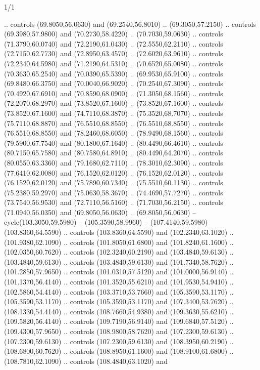 \begin{flagdescription}{1/1}
\begin{scope}[xshift=0.75\flaglength]
\begin{scope}[scale=0.00209\flagwidth,yshift=134.4mm,xshift=-29.7mm]
\begin{scope}[y=0.80pt, x=0.80pt, yscale=-1, xscale=1, inner sep=0pt, outer sep=0pt,line width=0.0015\flagwidth]
  .. controls (69.8050,56.0630) and (69.2540,56.8010) .. (69.3050,57.2150) ..
  controls (69.3980,57.9800) and (70.2730,58.4220) .. (70.7030,59.0630) ..
  controls (71.3790,60.0740) and (72.2190,61.0430) .. (72.5550,62.2110) ..
  controls (72.7150,62.7730) and (72.8950,63.4570) .. (72.6020,63.9610) ..
  controls (72.2340,64.5980) and (71.2190,64.5310) .. (70.6520,65.0080) ..
  controls (70.3630,65.2540) and (70.0390,65.5390) .. (69.9530,65.9100) ..
  controls (69.8480,66.3750) and (70.0040,66.9020) .. (70.2540,67.3090) ..
  controls (70.4920,67.6910) and (70.8590,68.0900) .. (71.3050,68.1560) ..
  controls (72.2070,68.2970) and (73.8520,67.1600) .. (73.8520,67.1600) ..
  controls (73.8520,67.1600) and (74.7110,68.3870) .. (75.3520,68.7070) ..
  controls (75.7110,68.8870) and (76.5510,68.8550) .. (76.5510,68.8550) ..
  controls (76.5510,68.8550) and (78.2460,68.6050) .. (78.9490,68.1560) ..
  controls (79.5900,67.7540) and (80.1800,67.1640) .. (80.4490,66.4610) ..
  controls (80.7150,65.7580) and (80.7580,64.8910) .. (80.4490,64.2070) ..
  controls (80.0550,63.3360) and (79.1680,62.7110) .. (78.3010,62.3090) ..
  controls (77.6410,62.0080) and (76.1520,62.0120) .. (76.1520,62.0120) ..
  controls (76.1520,62.0120) and (75.7890,60.7340) .. (75.5510,60.1130) ..
  controls (75.2380,59.2970) and (75.0630,58.3670) .. (74.4690,57.7270) ..
  controls (73.7540,56.9530) and (72.7110,56.5160) .. (71.7030,56.2150) ..
  controls (71.0940,56.0350) and (69.8050,56.0630) .. (69.8050,56.0630) --
  cycle(103.3050,59.5980) -- (105.3590,58.9960) --
  (107.4140,59.5980)(103.8360,64.5590) .. controls (103.8360,64.5590) and
  (102.2340,63.1020) .. (101.9380,62.1090) .. controls (101.8050,61.6800) and
  (101.8240,61.1600) .. (102.0350,60.7620) .. controls (102.3240,60.2190) and
  (103.4840,59.6130) .. (103.4840,59.6130) .. controls (103.4840,59.6130) and
  (101.7340,58.7620) .. (101.2850,57.9650) .. controls (101.0310,57.5120) and
  (101.0000,56.9140) .. (101.1370,56.4140) .. controls (101.3520,55.6210) and
  (101.9530,54.9410) .. (102.5860,54.4140) .. controls (103.3710,53.7660) and
  (105.3590,53.1170) .. (105.3590,53.1170) .. controls (105.3590,53.1170) and
  (107.3400,53.7620) .. (108.1330,54.4140) .. controls (108.7660,54.9380) and
  (109.3630,55.6210) .. (109.5820,56.4140) .. controls (109.7190,56.9140) and
  (109.6840,57.5120) .. (109.4300,57.9650) .. controls (108.9800,58.7620) and
  (107.2300,59.6130) .. (107.2300,59.6130) .. controls (107.2300,59.6130) and
  (108.3950,60.2190) .. (108.6800,60.7620) .. controls (108.8950,61.1600) and
  (108.9100,61.6800) .. (108.7810,62.1090) .. controls (108.4840,63.1020) and

\end{scope}
\end{scope}
\end{scope}
\end{flagdescription}

